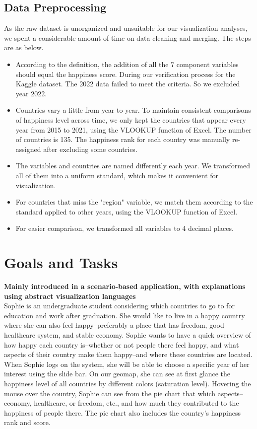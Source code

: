 \documentclass{article}
\begin{document}
\subsection{Data Preprocessing}
As the raw dataset is unorganized and unsuitable for our visualization analyses, we spent a considerable amount of time on data cleaning and merging. The steps are as below.
\begin{itemize}
    \item According to the definition, the addition of all the 7 component variables should equal the happiness score. During our verification process for the Kaggle dataset. The 2022 data failed to meet the criteria. So we excluded year 2022.
    \item Countries vary a little from year to year. To maintain consistent comparisons of happiness level across time, we only kept the countries that appear every year from 2015 to 2021, using the VLOOKUP function of Excel. The number of countries is 135. The happiness rank for each country was manually re-assigned after excluding some countries.
    \item The variables and countries are named differently each year. We transformed all of them into a uniform standard, which makes it convenient for visualization.
    \item For countries that miss the "region" variable, we match them according to the standard applied to other years, using the VLOOKUP function of Excel.
    \item For easier comparison, we transformed all variables to 4 decimal places.
\end{itemize}

\section{Goals and Tasks}
\textbf{Mainly introduced in a scenario-based application, with explanations using abstract visualization languages}\\

Sophie is an undergraduate student considering which countries to go to for education and work after graduation. She would like to live in a happy country where she can also feel happy–preferably a place that has freedom, good healthcare system, and stable economy. Sophie wants to have a quick overview of how happy each country is–whether or not people there feel happy, and what aspects of their country make them happy--and where these countries are located. When Sophie logs on the system, she will be able to choose a specific year of her interest using the slide bar. On our geomap, she can see at first glance the happiness level of all countries by different colors (saturation level). Hovering the mouse over the country, Sophie can see from the pie chart that which aspects–economy, healthcare, or freedom, etc., and how much they contributed to the happiness of people there. The pie chart also includes the country's happiness rank and score.
\end{document}
